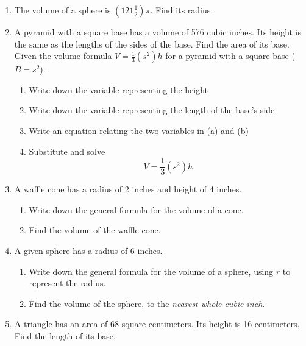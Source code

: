 \begin{enumerate}
\newpage
\item The volume of a sphere is $(121 \frac{1}{2}) \pi$. Find its radius. \vspace{2cm}

\item A pyramid with a square base has a volume of 576 cubic inches. Its height is the same as the lengths of the sides of the base. Find the area of its base.\\[0.5cm] Given the volume formula $V=\frac{1}{3}(s^2)h$ for a pyramid with a square base ($B=s^2$).
\begin{enumerate}[itemsep=0.5cm]
  \item Write down the variable representing the height
  \item Write down the variable representing the length of the base's side
  \item Write an equation relating the two variables in (a) and (b)
  \item Substitute and solve \[V=\frac{1}{3}(s^2)h\]
\end{enumerate} \vspace{2cm}

\item A waffle cone has a radius of 2 inches and height of 4 inches. 
\begin{enumerate}
  \item Write down the general formula for the volume of a cone. \vspace{1cm}
  \item Find the volume of the waffle cone.
\end{enumerate}  \vspace{2cm}

\item A given sphere has a radius of 6 inches.
\begin{enumerate}
  \item Write down the general formula for the volume of a sphere, using $r$ to represent the radius. \vspace{1cm}
  \item Find the volume of the sphere, to the \emph{nearest whole cubic inch}.
\end{enumerate}  \vspace{3cm}

\newpage
\item A triangle has an area of 68 square centimeters. Its height is 16 centimeters. Find the length of its base. \vspace{3cm}


\end{enumerate}
